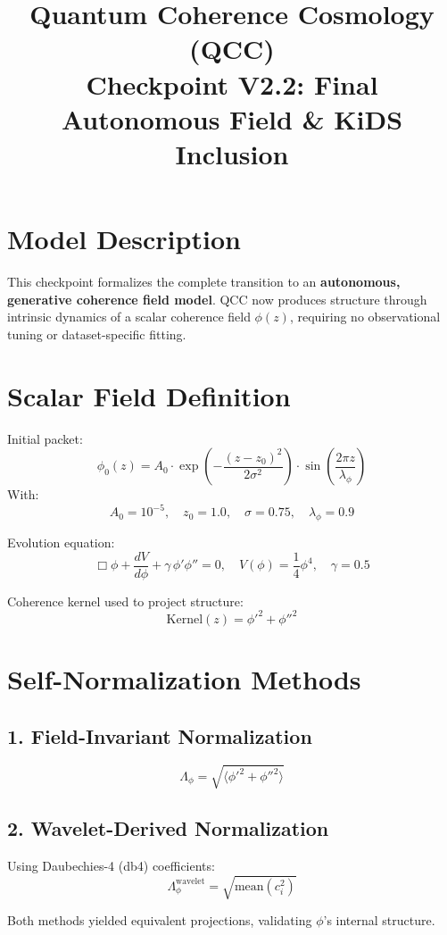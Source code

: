 \documentclass{article}
\title{Quantum Coherence Cosmology (QCC)\\Checkpoint V2.2: Final Autonomous Field \& KiDS Inclusion}
\author{}
\date{}
\begin{document}
\maketitle

\section*{Model Description}
This checkpoint formalizes the complete transition to an \textbf{autonomous, generative coherence field model}. QCC now produces structure through intrinsic dynamics of a scalar coherence field \( \phi(z) \), requiring no observational tuning or dataset-specific fitting.

\section*{Scalar Field Definition}
Initial packet:
\[
\phi_0(z) = A_0 \cdot \exp\left( - \frac{(z - z_0)^2}{2\sigma^2} \right) \cdot \sin\left( \frac{2\pi z}{\lambda_\phi} \right)
\]
With:
\[
A_0 = 10^{-5},\quad z_0 = 1.0,\quad \sigma = 0.75,\quad \lambda_\phi = 0.9
\]

Evolution equation:
\[
\Box \phi + \frac{dV}{d\phi} + \gamma \, \phi' \phi'' = 0,\quad V(\phi) = \frac{1}{4}\phi^4,\quad \gamma = 0.5
\]

Coherence kernel used to project structure:
\[
\text{Kernel}(z) = \phi'^2 + \phi''^2
\]

\section*{Self-Normalization Methods}
\subsection*{1. Field-Invariant Normalization}
\[
\Lambda_\phi = \sqrt{\langle \phi'^2 + \phi''^2 \rangle}
\]

\subsection*{2. Wavelet-Derived Normalization}
Using Daubechies-4 (db4) coefficients:
\[
\Lambda_\phi^{\text{wavelet}} = \sqrt{\text{mean}(c_i^2)}
\]

Both methods yielded equivalent projections, validating \( \phi \)'s internal structure.
\end{document}
